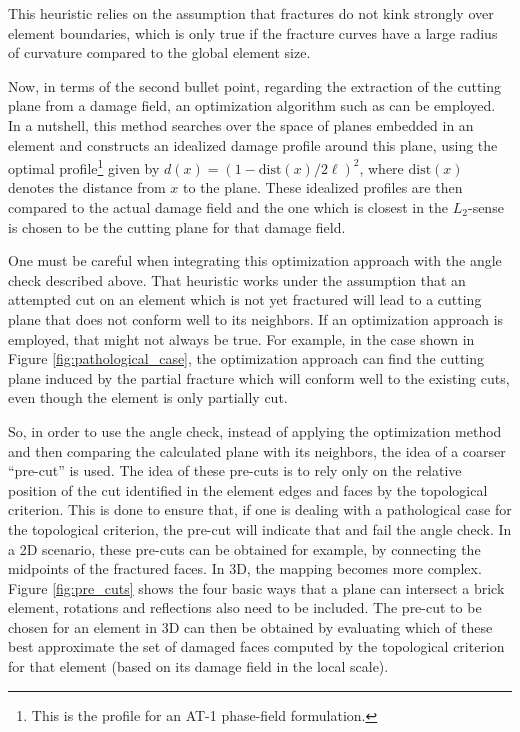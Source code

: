 This heuristic relies on the assumption that fractures do not kink strongly over element boundaries, which is only true if the fracture curves have a large radius of curvature compared to the global element size. 

Now, in terms of the second bullet point, regarding the extraction of the cutting plane from a damage field, an optimization algorithm such as \cite{geelen2018optimization} can be employed. In a nutshell, this method searches over the space of planes embedded in an element and constructs an idealized damage profile around this plane, using the optimal profile\footnote{This is the profile for an AT-1 phase-field formulation.} given by $d(x) = (1-\text{dist}(x)/2\ell)^2$, where $\text{dist}(x)$ denotes the distance from $x$ to the plane. These idealized profiles are then compared to the actual damage field and the one which is closest in the $L_2$-sense is chosen to be the cutting plane for that damage field.

One must be careful when integrating this optimization approach with the angle check described above. That heuristic works under the assumption that an attempted cut on an element which is not yet fractured will lead to a cutting plane that does not conform well to its neighbors. If an optimization approach is employed, that might not always be true. For example, in the case shown in Figure \ref{fig:pathological_case}, the optimization approach can find the cutting plane induced by the partial fracture which will conform well to the existing cuts, even though the element is only partially cut.

So, in order to use the angle check, instead of applying the optimization method and then comparing the calculated plane with its neighbors, the idea of a coarser ``pre-cut'' is used. The idea of these pre-cuts is to rely only on the relative position of the cut identified in the element edges and faces by the topological criterion. This is done to ensure that, if one is dealing with a pathological case for the topological criterion, the pre-cut will indicate that and fail the angle check. In a 2D scenario, these pre-cuts can be obtained for example, by connecting the midpoints of the fractured faces. In 3D, the mapping becomes more complex. Figure \ref{fig:pre_cuts} shows the four basic ways that a plane can intersect a brick element, rotations and reflections also need to be included. The pre-cut to be chosen for an element in 3D can then be obtained by evaluating which of these best approximate the set of damaged faces computed by the topological criterion for that element (based on its damage field in the local scale). 

